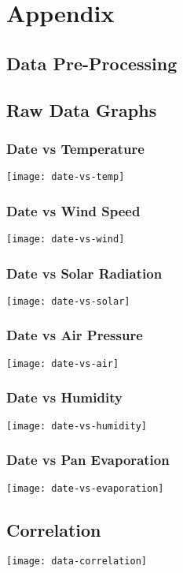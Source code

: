 \documentclass[10pt, a4paper]{article}
\begin{document}
\section{Appendix}
\begin{appendices}
	
	\section{Data Pre-Processing}
	\graphicspath{{graphics/}}
	
	\subsection{Raw Data Graphs}
	\label{appendix:raw-data-graphs}
	
	\subsubsection{Date vs Temperature}
	\label{appendix:date-vs-temp}
	\texttt{[image: date-vs-temp]}
	\subsubsection{Date vs Wind Speed}
	\label{appendix:date-vs-wind}
	\texttt{[image: date-vs-wind]}
	\subsubsection{Date vs Solar Radiation}
	\label{appendix:date-vs-solar}
	\texttt{[image: date-vs-solar]}
	\subsubsection{Date vs Air Pressure}
	\label{appendix:date-vs-air}
	\texttt{[image: date-vs-air]}
	\subsubsection{Date vs Humidity}
	\label{appendix:date-vs-humidity}
	\texttt{[image: date-vs-humidity]}
	\subsubsection{Date vs Pan Evaporation}
	\label{appendix:date-vs-evaporation}
	\texttt{[image: date-vs-evaporation]}
	
	\subsection{Correlation}
	\label{appendix:correlation}
	\texttt{[image: data-correlation]}
	

\end{appendices}
\end{document}
